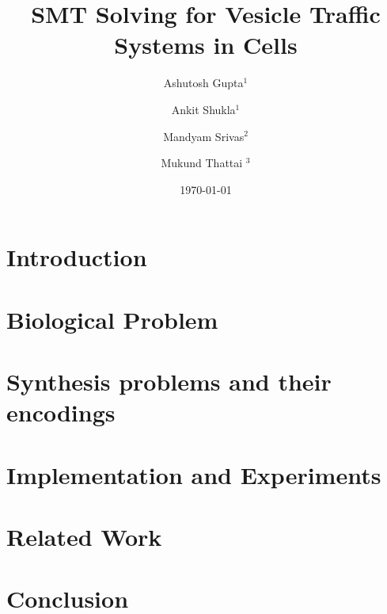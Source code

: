 \documentclass{llncs}
\begin{document}
\title{SMT Solving for Vesicle Traffic Systems in Cells}

\author{Ashutosh Gupta$^1$ \and Ankit Shukla$^1$ \and
  Mandyam Srivas$^2$ \and Mukund Thattai $^3$}


\date{\today}

\maketitle

\begin{abstract}

\end{abstract}

\section{Introduction}
\label{sec:intro}
% 


\section{Biological Problem}
\label{sec:bio}
% 


\section{Synthesis problems and their encodings}
\label{sec:encoding}


\section{Implementation and Experiments}
\label{sec:experiments}


\section{Related Work}
\label{sec:related}


\section{Conclusion}
\label{sec:conclusion}




\end{document}
